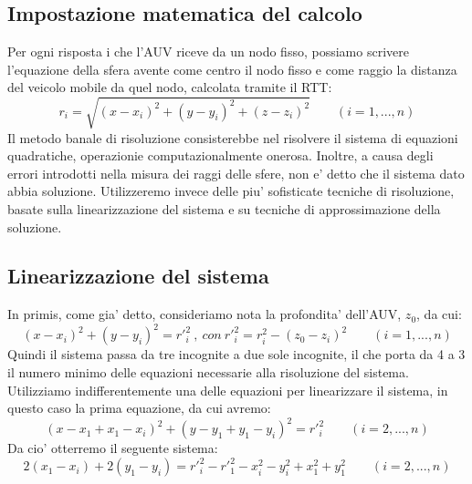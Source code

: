 \subsection{Impostazione matematica del calcolo}
Per ogni risposta i che l'AUV riceve da un nodo fisso, possiamo scrivere l'equazione della sfera avente come centro il nodo fisso e come raggio la distanza del veicolo mobile da quel nodo, calcolata tramite il RTT: \newline
\begin{equation}
r_{i} = \sqrt{(x-x_{i})^2+(y-y_{i})^2+(z-z_{i})^2} \qquad (i = 1,...,n)
\end{equation}
\newline
Il metodo banale di risoluzione consisterebbe nel risolvere il sistema di equazioni quadratiche, operazionie computazionalmente onerosa. Inoltre, a causa degli errori introdotti nella misura dei raggi delle sfere, non e' detto che il sistema dato abbia soluzione.
Utilizzeremo invece  delle piu' sofisticate tecniche di risoluzione, basate sulla linearizzazione del sistema e su tecniche di approssimazione della soluzione.\newline

\subsection{Linearizzazione del sistema}
In primis, come gia' detto, consideriamo nota la profondita' dell'AUV, $z_{0}$, da cui:
\begin{equation}
(x-x_{i})^2+(y-y_{i})^2 = r'^2_{i}\ ,\ con\ r'^2_{i} = r^2_{i}-(z_{0}-z_{i})^2 \qquad  (i = 1,...,n)
\end{equation}
\newline
Quindi il sistema passa da tre incognite a due sole incognite, il che porta da 4 a 3 il numero minimo delle equazioni necessarie alla risoluzione del sistema.
Utilizziamo indifferentemente una delle equazioni per linearizzare il sistema, in questo caso la prima equazione, da cui avremo:\newline
\begin{equation}
(x-x_{1}+x_{1}-x_{i})^2+(y-y_{1}+y_{1}-y_{i})^2 =  r'^2_{i} \qquad  (i = 2,...,n)
\end{equation}
\newline
Da cio' otterremo il seguente sistema:\newline
\begin{equation}
2(x_{1}-x_{i})+2(y_{1}-y_{i}) =  r'^2_{i}-r'^2_{1}-x^2_{i}-y^2_{i}+x^2_{1}+y^2_{1} \qquad (i = 2,...,n)
\end{equation}

